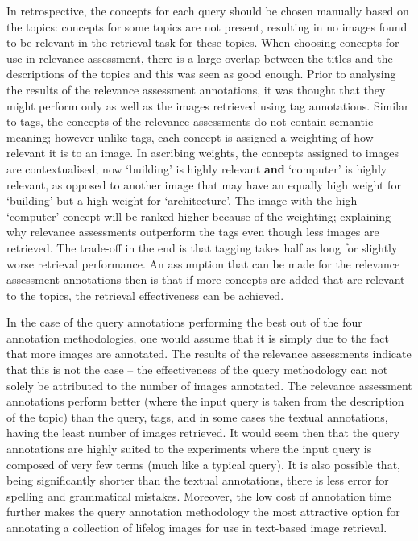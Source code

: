 In retrospective, the concepts for each query should be chosen manually based on the topics: concepts for some topics are not present, resulting in no images found to be relevant in the retrieval task for these topics. When choosing concepts for use in relevance assessment, there is a large overlap between the titles and the descriptions of the topics and this was seen as good enough. Prior to analysing the results of the relevance assessment annotations, it was thought that they might perform only as well as the images retrieved using tag annotations. Similar to tags, the concepts of the relevance assessments do not contain semantic meaning; however unlike tags, each concept is assigned a weighting of how relevant it is to an image. In ascribing weights, the concepts assigned to images are contextualised; now `building' is highly relevant \textbf{and} `computer' is highly relevant, as opposed to another image that may have an equally high weight for `building' but a high weight for `architecture'. The image with the high `computer' concept will be ranked higher because of the weighting; explaining why relevance assessments outperform the tags even though less images are retrieved. The trade-off in the end is that tagging takes half as long for slightly worse retrieval performance. An assumption that can be made for the relevance assessment annotations then is that if more concepts are added that are relevant to the topics, the retrieval effectiveness can be achieved.

In the case of the query annotations performing the best out of the four annotation methodologies, one would assume that it is simply due to the fact that more images are annotated. The results of the relevance assessments indicate that this is not the case -- the effectiveness of the query methodology can not solely be attributed to the number of images annotated. The relevance assessment annotations perform better (where the input query is taken from the description of the topic) than the query, tags, and in some cases the textual annotations, having the least number of images retrieved. It would seem then that the query annotations are highly suited to the experiments where the input query is composed of very few terms (much like a typical query). It is also possible that, being significantly shorter than the textual annotations, there is less error for spelling and grammatical mistakes. Moreover, the low cost of annotation time further makes the query annotation methodology the most attractive option for annotating a collection of lifelog images for use in text-based image retrieval.


